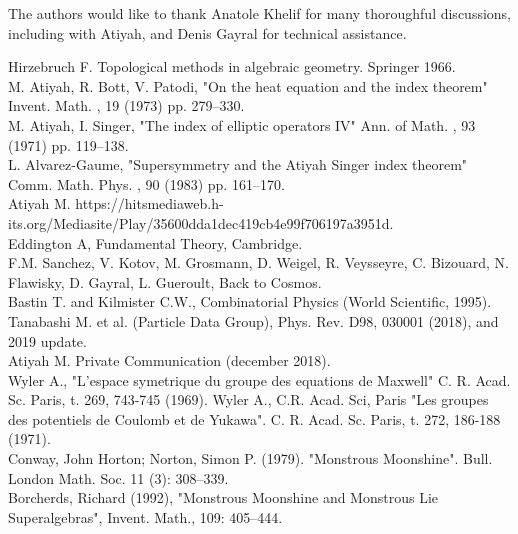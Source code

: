 \documentclass[a4paper,9pt]{article}
\begin{document}
The authors would like to thank Anatole Khelif for many thoroughful discussions, including with Atiyah, and Denis Gayral for technical assistance.

  
\begin{thebibliography}{99}
 Hirzebruch F. Topological methods in algebraic geometry. Springer 1966.\\
 M. Atiyah, R. Bott, V. Patodi, "On the heat equation and the index theorem" Invent. Math. , 19 (1973) pp. 279--330.\\
 M. Atiyah, I. Singer, "The index of elliptic operators IV" Ann. of Math. , 93 (1971) pp. 119--138. \\
 L. Alvarez-Gaume, "Supersymmetry and the Atiyah Singer index theorem" Comm. Math. Phys. , 90 (1983) pp. 161--170.\\
 Atiyah M. https://hitsmediaweb.h-its.org/Mediasite/Play/35600dda1dec419cb4e99f706197a3951d. \\ 
 Eddington A, Fundamental Theory, Cambridge.\\
 F.M. Sanchez, V. Kotov, M. Grosmann, D. Weigel, R. Veysseyre, C. Bizouard, N. Flawisky, D. Gayral, L. Gueroult, Back to Cosmos.\\
 Bastin T. and Kilmister C.W., Combinatorial Physics (World Scientific, 1995).\\
 Tanabashi M. et al. (Particle Data Group), Phys. Rev. D98, 030001 (2018), and 2019 update.\\
 Atiyah M. Private Communication (december 2018).\\
 Wyler A., "L'espace symetrique du groupe des equations de Maxwell" C. R. Acad. Sc. Paris, t. 269, 743-745 (1969). Wyler A., C.R. Acad. Sci, Paris "Les groupes des potentiels de Coulomb et de Yukawa". C. R. Acad. Sc. Paris, t. 272, 186-188 (1971).\\
 Conway, John Horton; Norton, Simon P. (1979). "Monstrous Moonshine". Bull. London Math. Soc. 11 (3): 308--339.\\
 Borcherds, Richard (1992), "Monstrous Moonshine and Monstrous Lie Superalgebras", Invent. Math., 109: 405--444.\\

\end{thebibliography}
\end{document}

